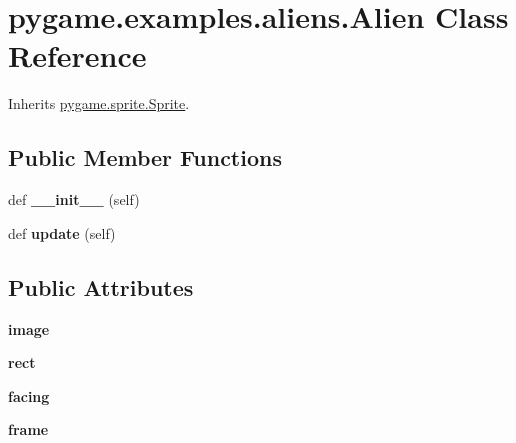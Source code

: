 \hypertarget{classpygame_1_1examples_1_1aliens_1_1_alien}{}\section{pygame.\+examples.\+aliens.\+Alien Class Reference}
\label{classpygame_1_1examples_1_1aliens_1_1_alien}


Inherits \hyperlink{classpygame_1_1sprite_1_1_sprite}{pygame.\+sprite.\+Sprite}.

\subsection*{Public Member Functions}
\begin{DoxyCompactItemize}
\item 
\mbox{\label{classpygame_1_1examples_1_1aliens_1_1_alien_ae73f047d3991a707a8bea4f8ccc2782e}} 
def {\bfseries \+\_\+\+\_\+init\+\_\+\+\_\+} (self)
\item 
\mbox{\label{classpygame_1_1examples_1_1aliens_1_1_alien_a85e6f360b24e9caaa32d0ce5191aee15}} 
def {\bfseries update} (self)
\end{DoxyCompactItemize}
\subsection*{Public Attributes}
\begin{DoxyCompactItemize}
\item 
\mbox{\label{classpygame_1_1examples_1_1aliens_1_1_alien_a10ef42ee6ac0b24138a170788c1ea321}} 
{\bfseries image}
\item 
\mbox{\label{classpygame_1_1examples_1_1aliens_1_1_alien_a18ea09b4f8458d89f180ea5a29510ccf}} 
{\bfseries rect}
\item 
\mbox{\label{classpygame_1_1examples_1_1aliens_1_1_alien_a7c5673f03fbfb3fa2b29e3e42c914dd9}} 
{\bfseries facing}
\item 
\mbox{\label{classpygame_1_1examples_1_1aliens_1_1_alien_a1e7fde36214ee83db15f4b56b4467e0c}} 
{\bfseries frame}
\end{DoxyCompactItemize}
